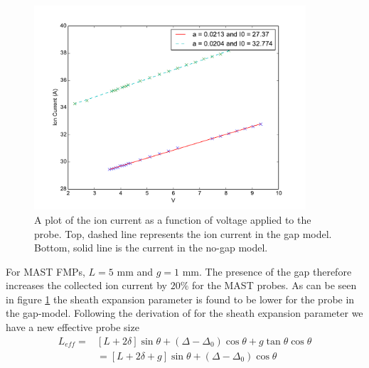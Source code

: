\begin{figure}[H]
	\centering
	\includegraphics[width=0.9\textwidth]{ion_current_gap_no_gap.pdf}
	\caption{A plot of the ion current as a function of voltage applied to the probe. Top, dashed line represents the ion current in the gap model. Bottom, solid line is the current in the no-gap model.}
	\label{fig:increased_I0)}
\end{figure}
For MAST FMPs, $L=5$ mm and $g = 1$ mm. The presence of the gap therefore increases the collected ion current by $20\%$ for the MAST probes. As can be seen in figure \ref{fig:increased_I0)} the sheath expansion parameter is found to be lower for the probe in the gap-model. Following the derivation of \cite{bergmann_1994} for the sheath expansion parameter we have a new effective probe size  
 \begin{equation}
 \begin{aligned}
 L_{eff} ={} & [L +2\delta] \sin{\theta}  + (\Delta - \Delta_0) \cos{\theta}  + g\tan{\theta} \cos{\theta}  \\
 & = [L +2\delta + g] \sin{\theta}  + (\Delta - \Delta_0) \cos{\theta} 
 \end{aligned}
 \end{equation}
 
